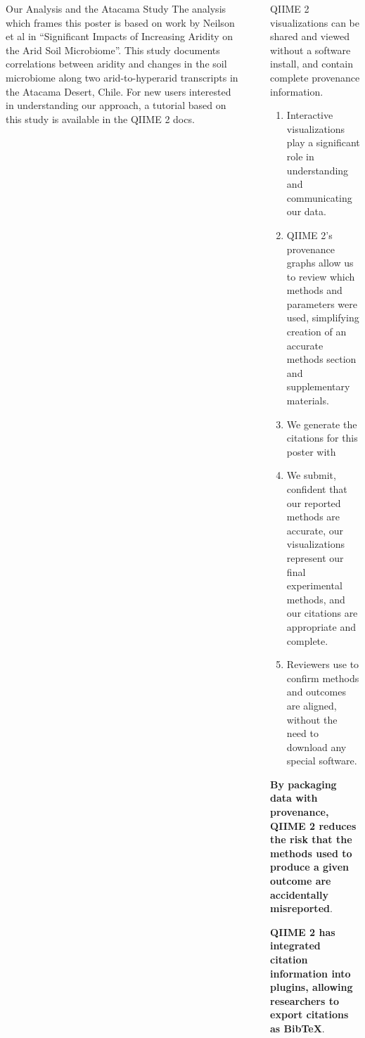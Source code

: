 \documentclass[final]{beamer}
\newlength{\sepwidth}
\newlength{\colwidth}
\newcommand{\separatorcolumn}{\begin{column}{\sepwidth}\end{column}}
\begin{document}
\begin{frame}[t]
\begin{columns}[t]
\begin{column}{\colwidth}
\begin{block}{Our Analysis and the Atacama Study}
    The analysis which frames this poster is based on work by Neilson et al in
    “Significant Impacts of Increasing Aridity on the Arid Soil Microbiome”\cite{Neilsone00195-16}.
     This study documents correlations between aridity and changes in the soil
    microbiome along two arid-to-hyperarid transcripts in the Atacama Desert,
    Chile. For new users interested in understanding our approach, a tutorial
    based on this study is available in the QIIME 2 docs. 

  \end{block}

\end{column}

\separatorcolumn

\begin{column}{\colwidth}

  \begin{block}{QIIME 2 visualizations can be shared and viewed without a software install, and contain complete provenance information.}

    \begin{enumerate}
      \item Interactive visualizations play a significant role in understanding and
      communicating our data. 
      \item QIIME 2’s provenance graphs allow us to review which methods and
      parameters were used, simplifying creation of an accurate methods section
      and supplementary materials.
      \item We generate the citations for this poster with 
      \item We submit, confident that our reported methods are accurate, our
      visualizations represent our final experimental methods, and our
      citations are appropriate and complete.
      \item Reviewers use  to confirm methods and outcomes are
      aligned, without the need to download any special software.
    \end{enumerate}

    \textbf{By packaging data with provenance, QIIME 2 reduces the risk that the
      methods used to produce a given outcome are accidentally misreported}.

    \textbf{QIIME 2 has integrated citation information into plugins, allowing
    researchers to export citations as BibTeX}.


\end{block}
\end{column}
\end{columns}
\end{frame}
\end{document}
